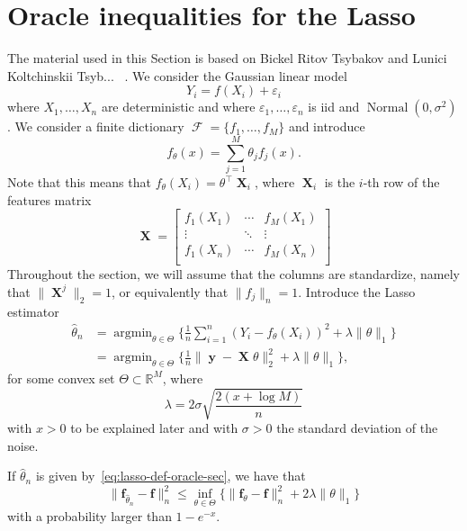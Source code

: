 \documentclass[
	fontsize=11pt, %
	twoside=false, %
	numbers=noenddot, %
]{kaobook}
\DeclareMathOperator{\cF}{{\mathcal F}}
\DeclareMathOperator{\bX}{{\boldsymbol X}}
\renewcommand{\bf}{{\boldsymbol f}}
\DeclareMathOperator{\by}{{\boldsymbol y}}
\DeclareMathOperator{\nor}{Normal}
\DeclareMathOperator*{\argmin}{argmin}
\newcommand{\eps}{\varepsilon}
\newcommand{\R}{\mathbb R}
\newcommand{\wh}{\widehat}
\newcommand{\norm}[1]{\| #1 \|}
\begin{document}
\section{Oracle inequalities for the Lasso} %

The material used in this Section is based on Bickel Ritov Tsybakov and Lunici Koltchinskii Tsyb... ~\sidecite{}.
We consider the Gaussian linear model
\begin{equation*}
	Y_i = f(X_i) + \eps_i
\end{equation*}
where $X_1, \ldots, X_n$ are deterministic and where $\eps_1, \ldots, \eps_n$ is iid and $\nor(0, \sigma^2)$.
We consider a finite dictionary $\cF = \{ f_1, \ldots, f_M \}$ and introduce
\begin{equation*}
	f_\theta(x) = \sum_{j=1}^M \theta_j f_j(x).
\end{equation*}
Note that this means that $f_\theta(X_i) = \theta^\top \bX_i$, where $\bX_i$ is the $i$-th row of the features matrix
\begin{equation*}
	\bX = \begin{bmatrix}
		f_1(X_1) & \cdots & f_M(X_1) \\
		\vdots & \ddots & \vdots \\ 
		f_1(X_n) & \cdots & f_M(X_n) \\
	\end{bmatrix}
\end{equation*}
Throughout the section, we will assume that the columns are standardize, namely that $\norm{\bX^j}_2 = 1$, or equivalently that $\norm{f_j}_n = 1$.
Introduce the Lasso estimator
\begin{equation}
	\label{eq:lasso-def-oracle-sec}
	\begin{split}
	\wh \theta_n &= \argmin_{\theta \in \Theta} \Big\{ \frac 1n \sum_{i=1}^n (Y_i - f_\theta(X_i))^2 + \lambda \norm{\theta}_1 \Big\} \\
	&= \argmin_{\theta \in \Theta} \Big\{ 
	\frac 1n \norm{\by - \bX \theta}_2^2 + \lambda \norm{\theta}_1 
	\Big\},
	\end{split}
\end{equation}
for some convex set $\Theta \subset \R^M$, where 
\begin{equation*}
	\lambda = 2 \sigma \sqrt{\frac{2(x + \log M)}{n}}
\end{equation*}
with $x > 0$ to be explained later and with $\sigma > 0$ the standard deviation of the noise. \todo{notation pour $\bf$ et autres}
\begin{theorem}
	\label{thm:oracle-slow}
	If $\wh \theta_n$ is given by~\eqref{eq:lasso-def-oracle-sec}, we have that
	\begin{equation*}
		\norm{\bf_{\wh \theta_n} - \bf}_n^2 \leq \inf_{\theta \in \Theta} 
		\Big\{ \norm{\bf_{\theta} - \bf}_n^2  + 2 \lambda \norm{\theta}_1 \Big\}
	\end{equation*}
	with a probability larger than $1 - e^{-x}$.
\end{theorem}
\end{document}
